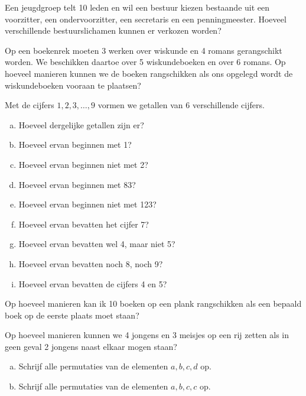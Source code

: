 \documentclass[12pt,twoside]{article}
\begin{document}
\begin{oefening}
Een jeugdgroep telt 10 leden en wil een bestuur kiezen bestaande uit een voorzitter, een ondervoorzitter, een secretaris en een penningmeester. Hoeveel verschillende bestuurslichamen kunnen er verkozen worden?
\end{oefening}

\begin{oefening}
Op een boekenrek moeten 3 werken over wiskunde en 4 romans gerangschikt worden. We beschikken daartoe over 5 wiskundeboeken en over 6 romans. Op hoeveel manieren kunnen we de boeken rangschikken als ons opgelegd wordt de wiskundeboeken vooraan te plaatsen?
\end{oefening}

\begin{oefening}
Met de cijfers $1, 2, 3, \ldots, 9$ vormen we getallen van $6$ verschillende cijfers.
\begin{enumerate}[(a)]
  \item Hoeveel dergelijke getallen zijn er?
  \item Hoeveel ervan beginnen met 1?
  \item Hoeveel ervan beginnen niet met 2?
  \item Hoeveel ervan beginnen met 83?
  \item Hoeveel ervan beginnen niet met 123?
  \item Hoeveel ervan bevatten het cijfer 7?
  \item Hoeveel ervan bevatten wel 4, maar niet 5?
  \item Hoeveel ervan bevatten noch 8, noch 9?
  \item Hoeveel ervan bevatten de cijfers 4 en 5?
\end{enumerate}
\end{oefening}

\begin{oefening}
Op hoeveel manieren kan ik 10 boeken op een plank rangschikken als een bepaald boek op de eerste plaats moet staan?
\end{oefening}

\begin{oefening}
Op hoeveel manieren kunnen we 4 jongens en 3 meisjes op een rij zetten als in geen geval 2 jongens naast elkaar mogen staan?
\end{oefening}

\begin{oefening}
\begin{enumerate}[(a)]
  \item Schrijf alle permutaties van de elementen $a,b,c,d$ op.
  \item Schrijf alle permutaties van de elementen $a,b,c,c$ op.
\end{enumerate}
\end{oefening}
\end{document}
